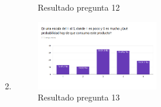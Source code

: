 \begin{enumerate}
\begin{figure}[H]
	\caption{Resultado pregunta 12}
\end{figure}
\item \begin{figure}[H]
	\centering
	\includegraphics[width=0.5\textwidth]{Apendice2/img/Consumir}
	\caption{Resultado pregunta 13}
\end{figure}

\end{enumerate}